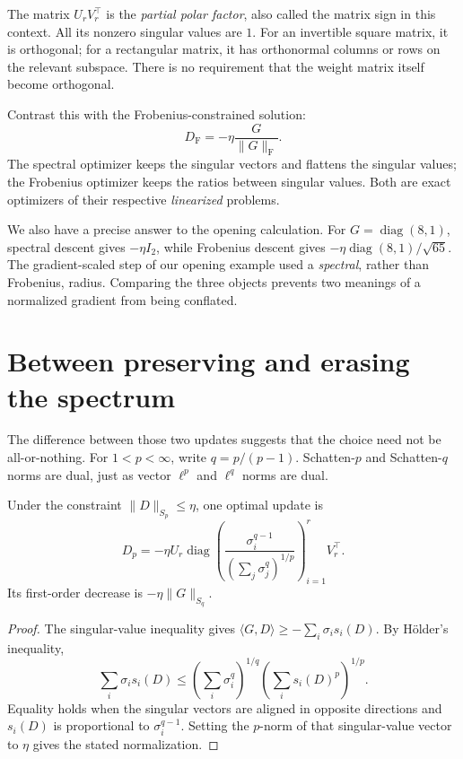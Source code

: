 The matrix \(U_rV_r^\top\) is the \emph{partial polar factor}, also called the matrix sign in this context.  All its nonzero singular values are \(1\).  For an invertible square matrix, it is orthogonal; for a rectangular matrix, it has orthonormal columns or rows on the relevant subspace.  There is no requirement that the weight matrix itself become orthogonal.

Contrast this with the Frobenius-constrained solution:
\[
 D_{\mathrm F}=-\eta\frac{G}{\|G\|_{\mathrm F}}.
\]
The spectral optimizer keeps the singular vectors and flattens the singular values; the Frobenius optimizer keeps the ratios between singular values.  Both are exact optimizers of their respective \emph{linearized} problems.

We also have a precise answer to the opening calculation.  For
\(G=\operatorname{diag}(8,1)\), spectral descent gives \(-\eta I_2\), while
Frobenius descent gives \(-\eta\operatorname{diag}(8,1)/\sqrt{65}\).  The gradient-scaled step of our opening example used a \emph{spectral}, rather than Frobenius, radius.  Comparing the three objects prevents two meanings of a normalized gradient from being conflated.

\section{Between preserving and erasing the spectrum}

The difference between those two updates suggests that the choice need not be all-or-nothing.  For \(1<p<\infty\), write \(q=p/(p-1)\).  Schatten-\(p\) and Schatten-\(q\) norms are dual, just as vector \(\ell^p\) and \(\ell^q\) norms are dual.

\begin{proposition}
Under the constraint \(\|D\|_{S_p}\leq\eta\), one optimal update is
\begin{equation}
 D_p=-\eta U_r
 \operatorname{diag}\left(
 \frac{\sigma_i^{q-1}}{(\sum_j\sigma_j^q)^{1/p}}
 \right)_{i=1}^rV_r^\top.
 \label{eq:N20261017-schatten-step}
\end{equation}
Its first-order decrease is \(-\eta\|G\|_{S_q}\).
\end{proposition}

\begin{proof}
The singular-value inequality gives
\(\langle G,D\rangle\geq-\sum_i\sigma_i s_i(D)\).
By H\"older's inequality,
\[
 \sum_i\sigma_i s_i(D)
 \leq\left(\sum_i\sigma_i^q\right)^{1/q}
      \left(\sum_i s_i(D)^p\right)^{1/p}.
\]
Equality holds when the singular vectors are aligned in opposite
directions and \(s_i(D)\) is proportional to \(\sigma_i^{q-1}\).
Setting the \(p\)-norm of that singular-value vector to \(\eta\)
gives the stated normalization.
\end{proof}

